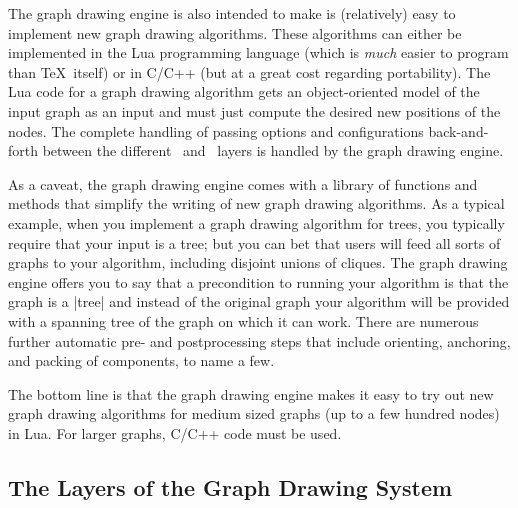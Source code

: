 The graph drawing engine is also intended to make is (relatively) easy to
implement new graph drawing algorithms. These algorithms can either be
implemented in the Lua programming language (which is \emph{much} easier to
program than \TeX\ itself) or in C/C++ (but at a great cost regarding
portability). The Lua code for a graph drawing algorithm gets an
object-oriented model of the input graph as an input and must just compute the
desired new positions of the nodes. The complete handling of passing options
and configurations back-and-forth between the different \tikzname\ and
\pgfname\ layers is handled by the graph drawing engine.

As a caveat, the graph drawing engine comes with a library of functions and
methods that simplify the writing of new graph drawing algorithms. As a typical
example, when you implement a graph drawing algorithm for trees, you typically
require that your input is a tree; but you can bet that users will feed all
sorts of graphs to your algorithm, including disjoint unions of cliques. The
graph drawing engine offers you to say that a precondition to running your
algorithm is that the graph is a |tree| and instead of the original graph your
algorithm will be provided with a spanning tree of the graph on which it can
work. There are numerous further automatic pre- and postprocessing steps that
include orienting, anchoring, and packing of components, to name a few.

The bottom line is that the graph drawing engine makes it easy
to try out new graph drawing algorithms for medium sized graphs (up
to a few hundred nodes) in Lua. For larger graphs, C/C++ code must be
used.


\subsection{The Layers of the Graph Drawing System}
\label{section-gd-layers}

